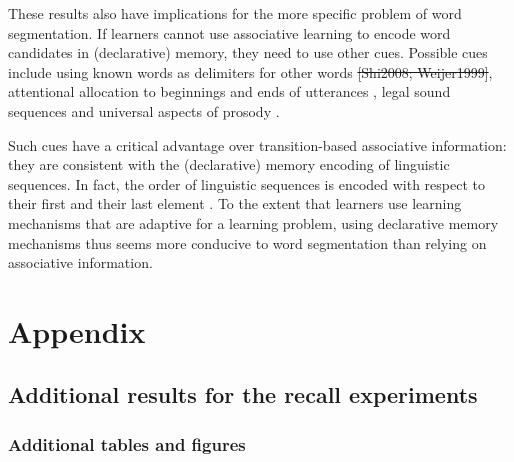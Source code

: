 \documentclass[
]{article}
\begin{document}
These results also have implications for the more specific problem of
word segmentation. If learners cannot use associative learning to encode
word candidates in (declarative) memory, they need to use other cues.
Possible cues include using known words as delimiters for other words
\citep{Bortfeld2005, Brent2001, Mersad2012} \st{{[}Shi2008;
Weijer1999{]}}, attentional allocation to beginnings and ends of
utterances \citep{Monaghan2010, Seidl2008, Shukla2011}, legal sound
sequences \citep{McQueen1998, Salverda2007} and universal aspects of
prosody
\citep{Brentari2011, Christophe2001, Endress-cross-seg, Fenlon2008, Johnson2009, Pilon1981}.

Such cues have a critical advantage over transition-based associative
information: they are consistent with the (declarative) memory encoding
of linguistic sequences. In fact, the order of linguistic sequences is
encoded with respect to their first and their last element
\citep{Endress-Phantoms-Vision, Fischer-Baum2011}. To the extent that
learners use learning mechanisms that are adaptive for a learning
problem, using declarative memory mechanisms thus seems more conducive
to word segmentation than relying on associative information.

\clearpage

\section{Appendix}\label{appendix}

\subsection{Additional results for the recall
experiments}\label{additional-results-for-the-recall-experiments}

\subsubsection{Additional tables and
figures}\label{additional-tables-and-figures}
\end{document}
